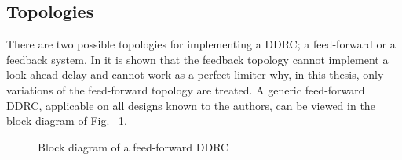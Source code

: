 \documentclass[../main2.tex]{subfiles}
\providecommand{\rootdir}{..}
\begin{document}
\subsection{Topologies}
There are two possible topologies for implementing a DDRC; a feed-forward or a feedback system. In \cite{reiss2012tutorial} it is shown that the feedback topology cannot implement a look-ahead delay and cannot work as a perfect limiter why, in this thesis, only variations of the feed-forward topology are treated. A generic feed-forward DDRC, applicable on all designs known to the authors, can be viewed in the block diagram of Fig. ~\ref{fig:block_genericDDRC}. 
\begin{figure}
\centerline{}
\caption{Block diagram of a feed-forward DDRC}
\label{fig:block_genericDDRC}
\end{figure}
\end{document}
